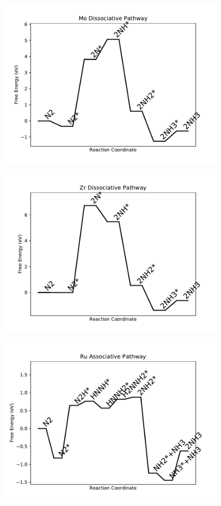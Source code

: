 \begin{figure}
\includegraphics[width=0.8\linewidth]{data/plots/Mo_dissociative.pdf}
\label{fig:Mo_dissociative}
\end{figure}

\begin{figure}
\includegraphics[width=0.8\linewidth]{data/plots/Zr_dissociative.pdf}
\label{fig:Zr_dissociative}
\end{figure}

\begin{figure}
\includegraphics[width=0.8\linewidth]{data/plots/Ru_associative.pdf}
\label{fig:Ru_associative}
\end{figure}


